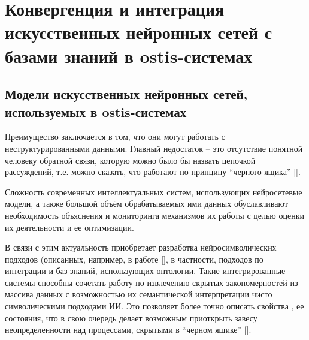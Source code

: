 \chapter{Конвергенция и интеграция искусственных нейронных сетей с базами знаний в ostis-системах}
\label{chapter_ann}


\section{Модели искусственных нейронных сетей, используемых в ostis-системах}

Преимущество  заключается в том, что они могут работать с неструктурированными данными.
Главный недостаток  -- это отсутствие понятной человеку обратной связи, которую можно было бы назвать цепочкой
рассуждений, т.е. можно сказать, что  работают по принципу ``черного ящика'' [].

Сложность современных интеллектуальных систем, использующих нейросетевые модели, а также большой объём обрабатываемых ими данных обуславливают необходимость объяснения и мониторинга механизмов их работы с целью оценки их деятельности и ее оптимизации.

В связи с этим актуальность приобретает разработка нейросимволических подходов (описанных, например, в работе [], в частности, подходов по интеграции  и баз знаний, использующих онтологии. Такие интегрированные системы способны сочетать работу  по извлечению скрытых закономерностей из массива данных с возможностью их семантической интерпретации чисто символическими подходами ИИ. Это позволяет более точно описать свойства , ее состояния, что в свою очередь делает возможным приоткрыть завесу неопределенности над процессами, скрытыми в ``черном ящике'' [].

